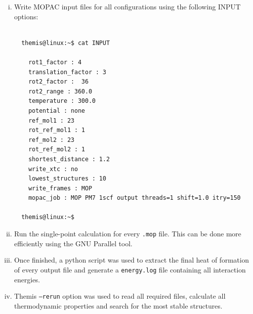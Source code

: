\documentclass[10pt,a4paper]{report}
\begin{document}
  \begin{enumerate}[i)]

  \item Write MOPAC input files for all configurations using the following INPUT
    options: \\

\begin{center}
  \begin{minipage}{0.45\textwidth}
    \vskip0.25cm
    \begin{verbatim}

  themis@linux:~$ cat INPUT 

    rot1_factor : 4                
    translation_factor : 3                 
    rot2_factor :  36                 
    rot2_range : 360.0               
    temperature : 300.0                 
    potential : none                   
    ref_mol1 : 23                     
    rot_ref_mol1 : 1                 
    ref_mol2 : 23                   
    rot_ref_mol2 : 1               
    shortest_distance : 1.2       
    write_xtc : no               
    lowest_structures : 10      
    write_frames : MOP         
    mopac_job : MOP PM7 1scf output threads=1 shift=1.0 itry=150

  themis@linux:~$

    \end{verbatim}
  \end{minipage}%
\end{center}

  \item Run the single-point calculation for every \texttt{.mop} file. This can
    be done more efficiently using the GNU Parallel tool.~\cite{parallel} \\

  \item Once finished, a python script was used to extract the final heat of
    formation of every output file and generate a \texttt{energy.log} file containing all
    interaction energies. \\

  \item Themis \texttt{--rerun} option was used to read all required files,
    calculate all thermodynamic properties and search for the most stable
    structures.\\

\end{enumerate}
\end{document}
